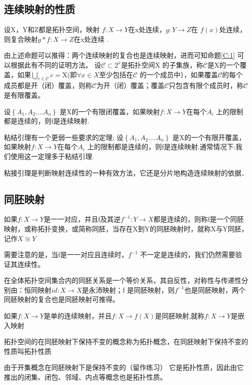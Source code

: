 \subsection*{连续映射的性质}
\begin{corollary}
    设X，Y和Z都是拓扑空间，映射 \(f: X \rightarrow Y\)在x处连续，\(g: Y \rightarrow Z \)在 \(f(x)\)处连续，则复合映射\(g*f: X \rightarrow Z \)在x处连续 .
\end{corollary}
由上述命题可以推得：两个连续映射的复合也是连续映射，进而可知命题\ref{C:1} 可以根据此有不同的证明方法。
设\(\mathscr{C} \subset 2^x\)是拓扑空间\(\mathrm{X}\) 的子集族，称\(\mathscr{C}\)是\(\mathrm{X}\)的一个覆盖，如果\(\bigcup_{c \in \mathscr{C}} c = \mathrm{X}\)(即\(\forall x \in X \)至少包括在\(\mathscr{C}\) 的一个成员中），如果覆盖\(\mathscr{C}\)的每个成员都是开（闭）覆盖，则称\(\mathscr{C}\)为开（闭）覆盖；覆盖\(\mathscr{C}\)只包含有限个成员时，称\(\mathscr{C}\)是有限覆盖。
\begin{theorem}[粘结引理]\label{粘结引理}
设\(\left\{A_1,A_2.\dots A_n \right\}\) 是X的一个有限闭覆盖，如果映射\(f: X \rightarrow Y\)在每个\(A_i\) 上的限制都是连续的，则f是连续映射.
\end{theorem}
\begin{note}
    粘结引理有一个更弱一些要求的定理; 设\(\left\{A_1,A_2.\dots A_n \right\}\) 是X的一个有限开覆盖，如果映射\(f: X \rightarrow Y\)在每个\(A_i\) 上的限制都是连续的，则f是连续映射.通常情况下:我们使用这一定理多于粘结引理.
\end{note}
粘接引理是判断映射连续性的一种有效方法，它还是分片地构造连续映射的依据．
\subsection*{同胚映射}
\begin{definition}
    如果\(f: X \rightarrow Y \)是一一对应，并且f及其逆\(f^{-1} : Y \rightarrow X \)都是连续的，则称f是一个同胚映射，或称拓扑变换，或简称同胚，当存在X到Y的同胚映射时，就称X与Y同胚，记作\(X \cong Y \)
\end{definition}
\begin{note}
    需要注意的是，当f是一一对应且连续时，\(f^{-1}\) 不一定是连续的，我们仍然需要验证其连续性。
\end{note}
在全体拓扑空间集合内的同胚关系是一个等价关系，其自反性，对称性与传递性分别由：恒同映射\(id : X \rightarrow X \)是永沛映射；f 是同胚映射，则\(f^{-1}\)也是同胚映射，两个同胚映射的复合也是同胚映射可推得。
\begin{definition}
    如果\(f: X \rightarrow Y \)是单的连续映射，并且\(f: X \rightarrow f(X)\)是同胚映射,就称\(f: X  \rightarrow Y \)是嵌入映射
\end{definition}
\begin{definition}
    拓扑空间的在同胚映射下保持不变的概念称为拓扑概念，在同胚映射下保持不变的性质叫拓扑性质
\end{definition}
\begin{note}
    由于开集概念在同胚映射下是保持不变的（留作练习） 它是拓扑性质，因此由它推出的闭集、闭包、邻域、内点等概念也是拓扑性质。
\end{note}
